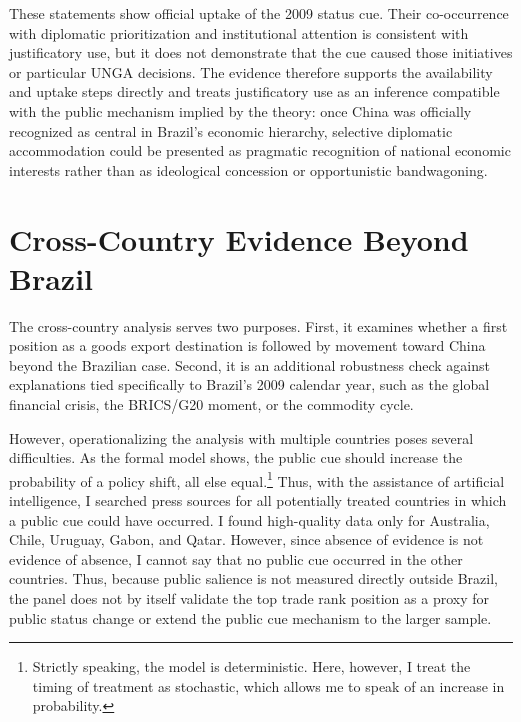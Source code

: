 \documentclass[referee,pdflatex,sn-basic]{sn-jnl}
\theoremstyle{thmstylethree}
\begin{document}
These statements show official uptake of the 2009 status cue. Their co-occurrence with diplomatic prioritization and institutional attention is consistent with justificatory use, but it does not demonstrate that the cue caused those initiatives or particular UNGA decisions. The evidence therefore supports the availability and uptake steps directly and treats justificatory use as an inference compatible with the public mechanism implied by the theory: once China was officially recognized as central in Brazil's economic hierarchy, selective diplomatic accommodation could be presented as pragmatic recognition of national economic interests rather than as ideological concession or opportunistic bandwagoning.

\section{Cross-Country Evidence Beyond Brazil}\label{cross-country-evidence-beyond-brazil}

The cross-country analysis serves two purposes. First, it examines whether a first position as a goods export destination is followed by movement toward China beyond the Brazilian case. Second, it is an additional robustness check against explanations tied specifically to Brazil's 2009 calendar year, such as the global financial crisis, the BRICS/G20 moment, or the commodity cycle.

However, operationalizing the analysis with multiple countries poses several difficulties. As the formal model shows, the public cue should increase the probability of a policy shift, all else equal.\footnote{Strictly speaking, the model is deterministic. Here, however, I treat the timing of treatment as stochastic, which allows me to speak of an increase in probability.} Thus, with the assistance of artificial intelligence, I searched press sources for all potentially treated countries in which a public cue could have occurred. I found high-quality data only for Australia, Chile, Uruguay, Gabon, and Qatar. However, since absence of evidence is not evidence of absence, I cannot say that no public cue occurred in the other countries. Thus, because public salience is not measured directly outside Brazil, the panel does not by itself validate the top trade rank position as a proxy for public status change or extend the public cue mechanism to the larger sample.
\end{document}
